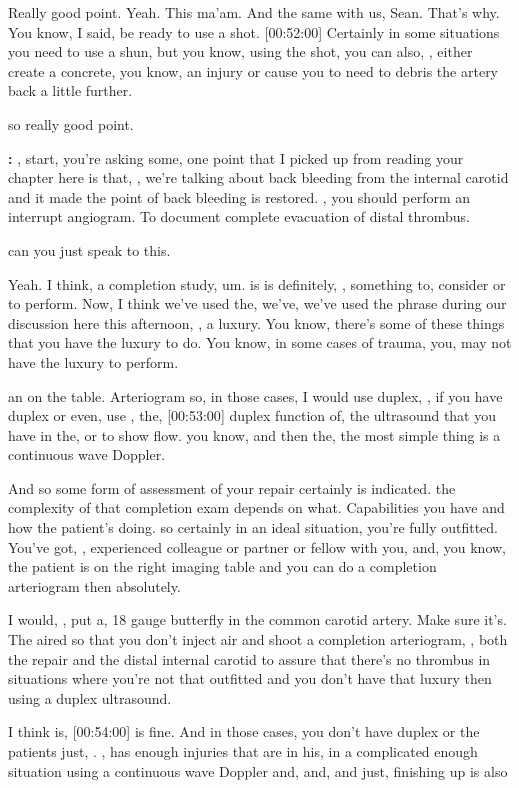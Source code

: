 \documentclass[
]{book}
\begin{document}
Really good
point. Yeah. This ma'am. And the same with us, Sean. That's why. You
know, I said, be ready to use a shot. {[}00:52:00{]} Certainly in some
situations you need to use a shun, but you know, using the shot, you can
also, , either create a concrete, you know, an injury or cause you to
need to debris the artery back a little further.

so really good point.

\textbf{:} , start, you're
asking some, one point that I picked up from reading your chapter here
is that, , we're talking about back bleeding from the internal carotid
and it made the point of back bleeding is restored. , you should perform
an interrupt angiogram. To document complete evacuation of distal
thrombus.

can you just speak to this.

Yeah. I
think, a completion study, um. is is definitely, , something to,
consider or to perform. Now, I think we've used the, we've, we've used
the phrase during our discussion here this afternoon, , a luxury. You
know, there's some of these things that you have the luxury to do. You
know, in some cases of trauma, you, may not have the luxury to perform.

an on the table. Arteriogram so, in those cases, I would use duplex,
, if you have duplex or even, use , the, {[}00:53:00{]} duplex function of,
the ultrasound that you have in the, or to show flow. you know, and
then the, the most simple thing is a continuous wave Doppler.

And so some form of assessment of your repair certainly is indicated.
the complexity of that completion exam depends on what. Capabilities
you have and how the patient's doing. so certainly in an ideal
situation, you're fully outfitted. You've got, , experienced colleague
or partner or fellow with you, and, you know, the patient is on the
right imaging table and you can do a completion arteriogram then
absolutely.

I would, , put a, 18 gauge butterfly in the common carotid artery. Make
sure it's. The aired so that you don't inject air and shoot a completion
arteriogram, , both the repair and the distal internal carotid to assure
that there's no thrombus in situations where you're not that outfitted
and you don't have that luxury then using a duplex ultrasound.

I think is, {[}00:54:00{]} is fine. And in those cases, you don't have
duplex or the patients just, . , has enough injuries that are in his, in
a complicated enough situation using a continuous wave Doppler and, and,
and just, finishing up is also
\end{document}
